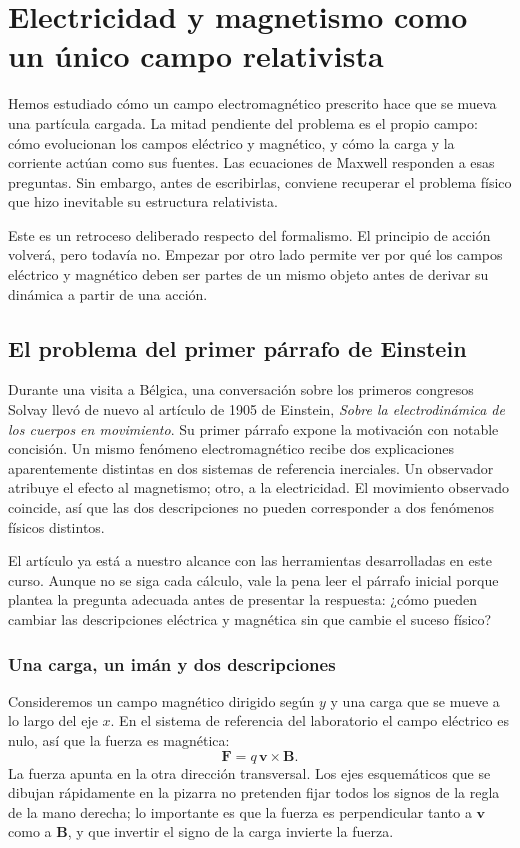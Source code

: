 \chapter{Electricidad y magnetismo como un único campo relativista}

Hemos estudiado cómo un campo electromagnético prescrito hace que se mueva una partícula cargada. La mitad pendiente del problema es el propio campo: cómo evolucionan los campos eléctrico y magnético, y cómo la carga y la corriente actúan como sus fuentes. Las ecuaciones de Maxwell responden a esas preguntas. Sin embargo, antes de escribirlas, conviene recuperar el problema físico que hizo inevitable su estructura relativista.

Este es un retroceso deliberado respecto del formalismo. El principio de acción volverá, pero todavía no. Empezar por otro lado permite ver por qué los campos eléctrico y magnético deben ser partes de un mismo objeto antes de derivar su dinámica a partir de una acción.

\section{El problema del primer párrafo de Einstein}

Durante una visita a Bélgica, una conversación sobre los primeros congresos Solvay llevó de nuevo al artículo de 1905 de Einstein, \emph{Sobre la electrodinámica de los cuerpos en movimiento}. Su primer párrafo expone la motivación con notable concisión. Un mismo fenómeno electromagnético recibe dos explicaciones aparentemente distintas en dos sistemas de referencia inerciales. Un observador atribuye el efecto al magnetismo; otro, a la electricidad. El movimiento observado coincide, así que las dos descripciones no pueden corresponder a dos fenómenos físicos distintos.

El artículo ya está a nuestro alcance con las herramientas desarrolladas en este curso. Aunque no se siga cada cálculo, vale la pena leer el párrafo inicial porque plantea la pregunta adecuada antes de presentar la respuesta: ¿cómo pueden cambiar las descripciones eléctrica y magnética sin que cambie el suceso físico?

\subsection{Una carga, un imán y dos descripciones}

Consideremos un campo magnético dirigido según \(y\) y una carga que se mueve a lo largo del eje \(x\). En el sistema de referencia del laboratorio el campo eléctrico es nulo, así que la fuerza es magnética: \begin{equation}
\mathbf F=q\,\mathbf v\times\mathbf B.
\end{equation}La fuerza apunta en la otra dirección transversal. Los ejes esquemáticos que se dibujan rápidamente en la pizarra no pretenden fijar todos los signos de la regla de la mano derecha; lo importante es que la fuerza es perpendicular tanto a \(\mathbf v\) como a \(\mathbf B\), y que invertir el signo de la carga invierte la fuerza.

